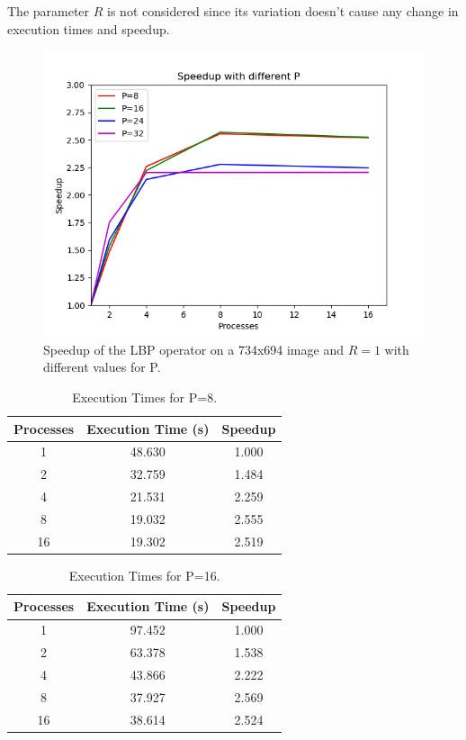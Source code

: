 \documentclass[10pt,twocolumn,letterpaper]{article}
\begin{document}
The parameter $R$ is not considered since its variation doesn't cause any change in execution times and speedup.

\begin{figure}[H]
	\includegraphics[width=\linewidth]{images/speedup_by_p.png}
	\caption{Speedup of the LBP operator on a 734x694 image and $R = 1$ with different values for P.}
	\label{fig:speedup_p}
\end{figure}

\begin{table}[H]
	\begin{center}
		\begin{tabular}{|c|c|c|}
			\hline
			Processes & Execution Time (s) & Speedup \\
			\hline
			1 & 48.630 & 1.000 \\
			2 & 32.759 & 1.484 \\
			4 & 21.531 & 2.259 \\
			8 & 19.032 & 2.555 \\
			16 & 19.302 & 2.519 \\
			\hline
		\end{tabular}
	\end{center}
	\caption{Execution Times for P=8.}
	\label{tab:speedup_p_1}
\end{table}

\begin{table}[H]
	\begin{center}
		\begin{tabular}{|c|c|c|}
			\hline
			Processes & Execution Time (s) & Speedup \\
			\hline
			1 & 97.452 & 1.000 \\
			2 & 63.378 & 1.538 \\
			4 & 43.866 & 2.222 \\
			8 & 37.927 & 2.569 \\
			16 & 38.614 & 2.524 \\
			\hline
		\end{tabular}
	\end{center}
	\caption{Execution Times for P=16.}
	\label{tab:speedup_p_2}
\end{table}
\end{document}
